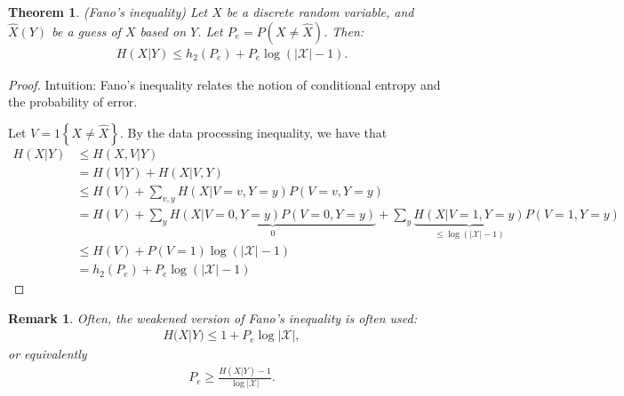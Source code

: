 \documentclass[12pt]{extarticle}
\newtheorem*{theorem}{Theorem}
\newtheorem*{remark}{Remark}
\def\ub{\underbrace}
\def\XX{\mathcal{X}}
\def\Xh{\hat{X}}
\begin{document}
\begin{theorem}
  (Fano's inequality) Let $X$ be a discrete random variable, and $\Xh(Y)$ be a guess of $X$ based on $Y$.  Let $P_e = P(X \neq \Xh)$.  Then:
  \begin{align*}
    H(X|Y) \leq h_2(P_e) + P_e \log (|\XX| - 1).
  \end{align*}
\end{theorem}

\begin{proof}
  Intuition: Fano's inequality relates the notion of conditional entropy and the probability of error.

  Let $V = 1\left\{ X \neq \Xh \right\}$.  By the data processing inequality, we have that
  \begin{align*}
    H(X|Y) & \leq H(X, V | Y) \\
    &= H(V | Y) + H(X | V, Y) \tag{chain rule}\\
    & \leq H(V) + \sum_{v, y} H(X | V = v, Y = y) P(V=v, Y=y) \tag{conditioning reduces entropy} \\
    &= H(V) + \sum_{y} \ub{H(X | V = 0, Y = y) P (V = 0, Y = y)}_{0} + \sum_{y} \ub{H(X | V = 1, Y = y)}_{\leq \log (|\XX| - 1)} P(V = 1, Y = y) \\
    &\leq H(V) + P(V=1) \log (|\XX| - 1)  \\
    &= h_2(P_e) + P_e \log (|\XX| - 1)
  \end{align*}
\end{proof}

\begin{remark}
  Often, the weakened version of Fano's inequality is often used:
\begin{align*}
  H(X|Y) \leq 1 + P_e \log |\XX|,
\end{align*}
or equivalently
\begin{align*}
  P_e \geq \frac{H(X|Y) -1}{\log |\XX|}.
\end{align*}
\end{remark}
\end{document}
